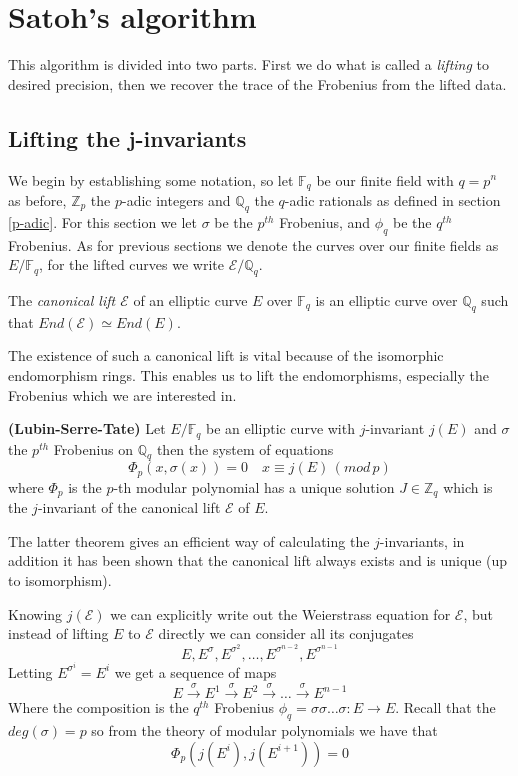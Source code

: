 \section{Satoh's algorithm} \label{satoh}
This algorithm is divided into two parts. First we do what is called a \emph{lifting} to desired
precision, then we recover the trace of the Frobenius from the lifted data.

\subsection{Lifting the j-invariants}
We begin by establishing some notation, so let $\mathbb{F}_q$ be our finite field with $q=p^n$ as before,
$\mathbb{Z}_p$ the $p$-adic integers and $\mathbb{Q}_q$ the $q$-adic rationals as defined in section \ref{p-adic}.
For this section we let $\sigma$ be the $p^{th}$ Frobenius, and $\phi_q$ be the $q^{th}$ Frobenius.
As for previous sections we denote the curves over our finite fields as $E/\mathbb{F}_q$,
for the lifted curves we write $\mathscr{E}/\mathbb{Q}_q$.

\begin{mydef}
 The \emph{canonical lift $\mathscr{E}$} of an elliptic curve $E$ over $\mathbb{F}_q$ is
an elliptic curve over $\mathbb{Q}_q$ such that $End(\mathscr{E}) \simeq End(E)$.
\end{mydef}

The existence of such a canonical lift is vital because of the isomorphic endomorphism rings. This
enables us to lift the endomorphisms, especially the Frobenius which we are interested in.

\begin{thm}
 \textbf{(Lubin-Serre-Tate)} Let $E/\mathbb{F}_q$ be an elliptic curve with $j$-invariant $j(E)$ and
$\sigma$ the $p^{th}$ Frobenius on $\mathbb{Q}_q$ then the system of equations
$$ \Phi_p(x, \sigma(x)) = 0 \quad x \equiv j(E) \, (mod\, p)$$
where $\Phi_p$ is the $p$-th modular polynomial has a unique solution $J \in \mathbb{Z}_q$ 
which is the $j$-invariant of the canonical lift $\mathscr{E}$ of $E$.
\end{thm}
The latter theorem gives an efficient way of calculating the $j$-invariants, in addition it has
been shown \cite{Deuring} that the canonical lift always exists and is unique (up to isomorphism).

Knowing $j(\mathscr{E})$ we can explicitly write out the Weierstrass equation for $\mathscr{E}$, but
instead of lifting $E$ to $\mathscr{E}$ directly we can consider all its conjugates
$$E, E^\sigma, E^{\sigma^2}, \ldots, E^{\sigma^{n-2}}, E^{\sigma^{n-1}} $$
Letting $E^{\sigma^i} = E^i $ we get a sequence of maps
$$ E \overset{\sigma}{\rightarrow} E^1 \overset{\sigma}{\rightarrow} E^2 \overset{\sigma}{\rightarrow}
\ldots \overset{\sigma}{\rightarrow} E^{n-1} $$
Where the composition is the $q^{th}$ Frobenius $\phi_q = \sigma \sigma \ldots \sigma: E \rightarrow E$.
Recall that the $deg(\sigma) = p$ so from the theory of modular polynomials we have that
$$ \Phi_p(j(E^i), j(E^{i+1})) = 0 $$



